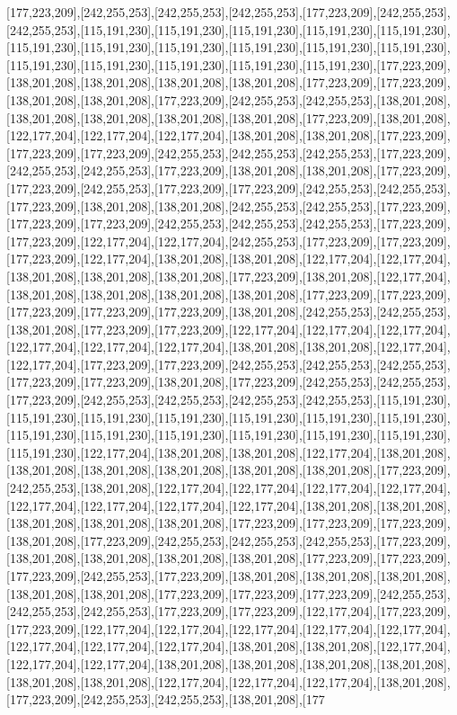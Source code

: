 [177,223,209],[242,255,253],[242,255,253],[242,255,253],[177,223,209],[242,255,253],[242,255,253],[115,191,230],[115,191,230],[115,191,230],[115,191,230],[115,191,230],[115,191,230],[115,191,230],[115,191,230],[115,191,230],[115,191,230],[115,191,230],[115,191,230],[115,191,230],[115,191,230],[115,191,230],[115,191,230],[177,223,209],[138,201,208],[138,201,208],[138,201,208],[138,201,208],[177,223,209],[177,223,209],[138,201,208],[138,201,208],[177,223,209],[242,255,253],[242,255,253],[138,201,208],[138,201,208],[138,201,208],[138,201,208],[138,201,208],[177,223,209],[138,201,208],[122,177,204],[122,177,204],[122,177,204],[138,201,208],[138,201,208],[177,223,209],[177,223,209],[177,223,209],[242,255,253],[242,255,253],[242,255,253],[177,223,209],[242,255,253],[242,255,253],[177,223,209],[138,201,208],[138,201,208],[177,223,209],[177,223,209],[242,255,253],[177,223,209],[177,223,209],[242,255,253],[242,255,253],[177,223,209],[138,201,208],[138,201,208],[242,255,253],[242,255,253],[177,223,209],[177,223,209],[177,223,209],[242,255,253],[242,255,253],[242,255,253],[177,223,209],[177,223,209],[122,177,204],[122,177,204],[242,255,253],[177,223,209],[177,223,209],[177,223,209],[122,177,204],[138,201,208],[138,201,208],[122,177,204],[122,177,204],[138,201,208],[138,201,208],[138,201,208],[177,223,209],[138,201,208],[122,177,204],[138,201,208],[138,201,208],[138,201,208],[138,201,208],[177,223,209],[177,223,209],[177,223,209],[177,223,209],[177,223,209],[138,201,208],[242,255,253],[242,255,253],[138,201,208],[177,223,209],[177,223,209],[122,177,204],[122,177,204],[122,177,204],[122,177,204],[122,177,204],[122,177,204],[138,201,208],[138,201,208],[122,177,204],[122,177,204],[177,223,209],[177,223,209],[242,255,253],[242,255,253],[242,255,253],[177,223,209],[177,223,209],[138,201,208],[177,223,209],[242,255,253],[242,255,253],[177,223,209],[242,255,253],[242,255,253],[242,255,253],[242,255,253],[115,191,230],[115,191,230],[115,191,230],[115,191,230],[115,191,230],[115,191,230],[115,191,230],[115,191,230],[115,191,230],[115,191,230],[115,191,230],[115,191,230],[115,191,230],[115,191,230],[122,177,204],[138,201,208],[138,201,208],[122,177,204],[138,201,208],[138,201,208],[138,201,208],[138,201,208],[138,201,208],[138,201,208],[177,223,209],[242,255,253],[138,201,208],[122,177,204],[122,177,204],[122,177,204],[122,177,204],[122,177,204],[122,177,204],[122,177,204],[122,177,204],[138,201,208],[138,201,208],[138,201,208],[138,201,208],[138,201,208],[177,223,209],[177,223,209],[177,223,209],[138,201,208],[177,223,209],[242,255,253],[242,255,253],[242,255,253],[177,223,209],[138,201,208],[138,201,208],[138,201,208],[138,201,208],[177,223,209],[177,223,209],[177,223,209],[242,255,253],[177,223,209],[138,201,208],[138,201,208],[138,201,208],[138,201,208],[138,201,208],[177,223,209],[177,223,209],[177,223,209],[242,255,253],[242,255,253],[242,255,253],[177,223,209],[177,223,209],[122,177,204],[177,223,209],[177,223,209],[122,177,204],[122,177,204],[122,177,204],[122,177,204],[122,177,204],[122,177,204],[122,177,204],[122,177,204],[138,201,208],[138,201,208],[122,177,204],[122,177,204],[122,177,204],[138,201,208],[138,201,208],[138,201,208],[138,201,208],[138,201,208],[138,201,208],[122,177,204],[122,177,204],[122,177,204],[138,201,208],[177,223,209],[242,255,253],[242,255,253],[138,201,208],[177
